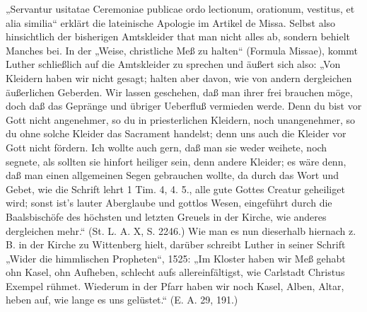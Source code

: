 „Servantur usitatae Ceremoniae publicae ordo lectionum, orationum, vestitus, et alia similia“ erklärt die lateinische Apologie im Artikel de Missa. Selbst also hinsichtlich der bisherigen Amtskleider that man nicht alles ab, sondern behielt Manches bei. In der „Weise, christliche Meß zu halten“ (Formula Missae), kommt Luther schließlich auf die Amtskleider zu sprechen und äußert sich also: „Von Kleidern haben wir nicht gesagt; halten aber davon, wie von andern dergleichen äußerlichen Geberden. Wir lassen geschehen, daß man ihrer frei brauchen möge, doch daß das Gepränge und übriger Ueberfluß vermieden werde. Denn du bist vor Gott nicht angenehmer, so du in priesterlichen Kleidern, noch unangenehmer, so du ohne solche Kleider das Sacrament handelst; denn uns auch die Kleider vor Gott nicht fördern. Ich wollte auch gern, daß man sie weder weihete, noch segnete, als sollten sie hinfort heiliger sein, denn andere Kleider; es wäre denn, daß man einen allgemeinen Segen gebrauchen wollte, da durch das Wort und Gebet, wie die Schrift lehrt 1 Tim. 4, 4. 5., alle gute Gottes Creatur geheiliget wird; sonst ist’s lauter Aberglaube und gottlos Wesen, eingeführt durch die Baalsbischöfe des höchsten und letzten Greuels in der Kirche, wie anderes dergleichen mehr.“ (St. L. A. X, S. 2246.) Wie man es nun dieserhalb hiernach z. B. in der Kirche zu Wittenberg hielt, darüber schreibt Luther in seiner Schrift „Wider die himmlischen Propheten“, 1525: „Im Kloster haben wir Meß gehabt ohn Kasel, ohn Aufheben, schlecht aufs allereinfältigst, wie Carlstadt Christus Exempel rühmet. Wiederum in der Pfarr haben wir noch Kasel, Alben, Altar, heben auf, wie lange es uns gelüstet.“ (E. A. 29, 191.)

